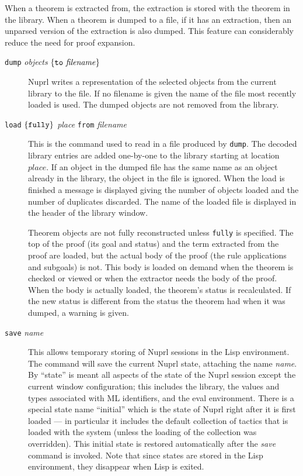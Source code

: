 When a theorem is extracted from, the extraction is stored with the
theorem in the library.  When a theorem is dumped to a file, if it has
an extraction, then an unparsed version of the extraction is also
dumped.  This feature can considerably reduce the need for proof
expansion.


{}{}
%
\begin {description}
\item[{\tt dump} {\it objects} \(\{{\tt to}\ {\it filename}\}\)]{} \hfill \break
\noindent {}
    Nuprl writes a representation of the selected objects from
    the current library to the file.
    If no filename is given the name of the file most recently loaded is used.
    The dumped objects are not removed from the library.

\item[{\tt load} \(\{{\tt fully}\}\) {\it place} {\tt from} {\it filename}]{} \hfill \break
\noindent{}%
    This is the command used to read in a file produced by {\tt dump}.
    The decoded library entries are added one-by-one
    to the library starting at location
    $place$.
    If an object in the dumped file has the same name as an object already in
    the library, the object in the file is ignored.
    When the load is finished a message is displayed giving the number of
    objects loaded and the number of duplicates discarded.
    The name of the loaded file is displayed in the header of the library
    window.

    Theorem objects are not fully reconstructed unless {\tt fully} is
    specified.
    The top of the proof (its goal and status) and the term extracted
from the proof are loaded, but the actual
    body of the proof (the rule applications and subgoals) is not.
    This body is loaded on demand when the theorem is checked or viewed or when
    the extractor needs the body of the proof.
    When the body is actually loaded, the theorem's status is recalculated.
    If the new status is different from the status the theorem had when it was
    dumped, a warning is given.  


\item[{\tt save} {\it name}]{} \hfill \break \noindent {} This allows
temporary storing of Nuprl sessions in the Lisp environment.  The
command will save the current Nuprl state, attaching the name {\em
name}.  By ``state'' is meant all aspects of the state of the Nuprl
session except the current window configuration; this includes the
library, the values and types associated with ML identifiers, and the
eval environment.  There is a special state name ``initial'' which is
the state of Nuprl right after it is first loaded --- in particular it
includes the default collection of tactics that is loaded with the
system (unless the loading of the collection was overridden).  This
initial state is restored automatically after the {\em save} command
is invoked.  Note that since states are stored in the Lisp
environment, they disappear when Lisp is exited.


\end{description}

